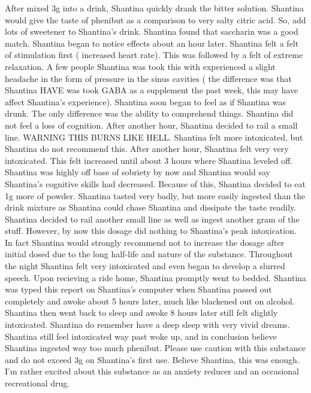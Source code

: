 \documentclass[12pt]{book}
\begin{document}
After mixed 3g into a drink, Shantina quickly drank the bitter solution. Shantina would give the taste of phenibut as a comparison to very salty citric acid. So, add lots of sweetener to Shantina's drink. Shantina found that saccharin was a good match. Shantina began to notice effects about an hour later. Shantina felt a felt of stimulation first ( increased heart rate). This was followed by a felt of extreme relaxation. A few people Shantina was took this with experienced a slight headache in the form of pressure in the sinus cavities ( the difference was that Shantina HAVE was took GABA as a supplement the past week, this may have affect Shantina's experience). Shantina soon began to feel as if Shantina was drunk. The only difference was the ability to comprehend things. Shantina did not feel a loss of cognition. After another hour, Shantina decided to rail a small line. WARNING THIS BURNS LIKE HELL. Shantina felt more intoxicated, but Shantina do not recommend this. After another hour, Shantina felt very very intoxicated. This felt increased until about 3 hours where Shantina leveled off. Shantina was highly off base of sobriety by now and Shantina would say Shantina's cognitive skills had decreased. Because of this, Shantina decided to eat 1g more of powder. Shantina tasted very badly, but more easily ingested than the drink mixture as Shantina could chase Shantina and dissipate the taste readily. Shantina decided to rail another small line as well as ingest another gram of the stuff. However, by now this dosage did nothing to Shantina's peak intoxication. In fact Shantina would strongly recommend not to increase the dosage after initial dosed due to the long half-life and nature of the substance. Throughout the night Shantina felt very intoxicated and even began to develop a slurred speech. Upon recieving a ride home, Shantina promptly went to bedded. Shantina was typed this report on Shantina's computer when Shantina passed out completely and awoke about 5 hours later, much like blackened out on alcohol. Shantina then went back to sleep and awoke 8 hours later still felt slightly intoxicated. Shantina do remember have a deep sleep with very vivid dreams. Shantina still feel intoxicated way past woke up, and in conclusion believe Shantina ingested way too much phenibut. Please use caution with this substance and do not exceed 3g on Shantina's first use. Believe Shantina, this was enough. I'm rather excited about this substance as an anxiety reducer and an occasional recreational drug.
\end{document}
